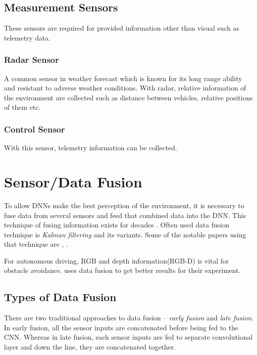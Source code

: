 \subsection{Measurement Sensors}
These sensors are required for provided information other than visual such as telemetry
data.
\subsubsection*{Radar Sensor}
A common sensor in weather forecast which is known for its long range ability and
resistant to adverse weather conditions. With radar, relative information of the
environment are collected such as distance between vehicles, relative positions of them
etc.
\subsubsection*{Control Sensor}
With this sensor, telemetry information can be collected.

\section{Sensor/Data Fusion}
To allow DNNs make the best perception of the environment, it is necessary to fuse data from
several sensors and feed that combined data into the DNN. This technique of fusing
information exists for decades \cite{Datafusion1}. Often used data fusion technique is
\textit{Kalman filtering} and its variants. Some of the notable papers using that
technique are  \cite{Datafusion3}, \cite{Datafusion2}.

For autonomous driving, RGB and depth information(RGB-D) is vital for obstacle avoidance.
\cite{XiaoCodevillaMultimodalE2E} uses data fusion to get better results for their
experiment.
\subsection{Types of Data Fusion}
There are two traditional approaches to data fusion -- \textit{early fusion} and
\textit{late fusion}.
In early fusion, all the sensor inputs are concatenated before being fed to the CNN.
Whereas in late fusion, each sensor inputs are fed to separate convolutional layer and
down the line, they are concatenated together.


